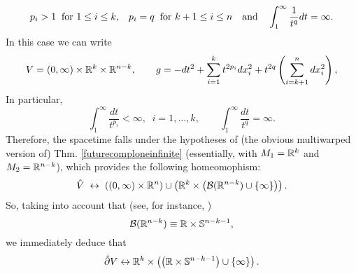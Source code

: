\[
p_i>1\;\;\hbox{for $1\leq i\leq k$,}\quad p_i=q\;\;\hbox{for $k+1\leq i\leq n$}\quad\hbox{and}\quad \int_1^{\infty}\frac{1}{t^{q}}dt=\infty.
\]
In this case we can write
\[
V=(0,\infty)\times{\mathbb R}^k\times{\mathbb R}^{n-k},\qquad g=-dt^2+\sum_{i=1}^{k}t^{2p_i}dx_i^2+t^{2q}\left(\sum_{i=k+1}^ndx_i^2 \right),
\]
In particular,
\[
\int_{1}^{\infty}\frac{dt}{t^{p_i}}<\infty,\;\; i=1,\ldots,k,\qquad\int_{1}^{\infty}\frac{dt}{t^{q}}=\infty.
\]
Therefore, the spacetime falls under the hypotheses of (the obvious multiwarped version of) Thm. \ref{futurecomploneinfinite} (essentially, with $M_1={\mathbb R}^k$ and $M_2={\mathbb R}^{n-k}$), which provides
the following homeomophism:
          \[
\hat{V}\;\leftrightarrow\; \left((0,\infty)\times {\mathbb R}^n\right)\cup \left({\mathbb R}^k\times \left({\cal B}({\mathbb R}^{n-k})\cup \{\infty\}\right)\right).
            \]
            So, taking into account that (see, for instance, \cite[Section 5.1]{H2})
            \[
{\cal B}({\mathbb R}^{n-k})\equiv {\mathbb R}\times \mathbb{S}^{n-k-1},
              \]
              we immediately deduce that
              \[
\hat{\partial} V\leftrightarrow {\mathbb R}^k \times \left(\left({\mathbb R}\times \mathbb{S}^{n-k-1}\right)\cup \{\infty\} \right).
                \]




